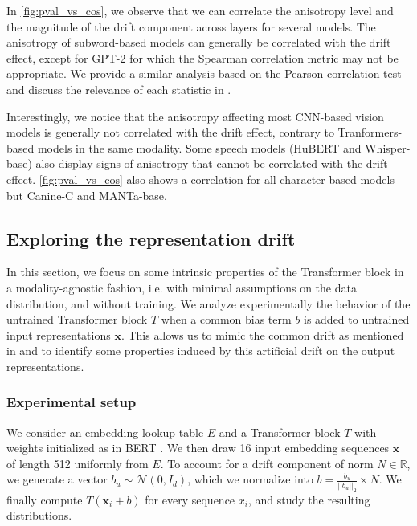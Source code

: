 In \autoref{fig:pval_vs_cos}, we observe that we can correlate the anisotropy level and the magnitude of the drift component across layers for several models. The anisotropy of subword-based models can generally be correlated with the drift effect, except for GPT-2 for which the Spearman correlation metric may not be appropriate. We provide a similar analysis based on the Pearson correlation test and discuss the relevance of each statistic in . 

Interestingly, we notice that the anisotropy affecting most CNN-based vision models is generally not correlated with the drift effect, contrary to Tranformers-based models in the same modality. Some speech models (HuBERT and Whisper-base) also display signs of anisotropy that cannot be correlated with the drift effect. \autoref{fig:pval_vs_cos} also shows a correlation for all character-based models but Canine-C and MANTa-base.

\subsection{Exploring the representation drift}
\label{sec:empirical}
In this section, we focus on some intrinsic properties of the Transformer block in a modality-agnostic fashion, i.e. with minimal assumptions on the data distribution, and without training. We analyze experimentally the behavior of the untrained Transformer block $T$ when a common bias term $b$ is added to untrained input representations $\mathbf{x}$. This allows us to mimic the common drift as mentioned in \citet{bis-etal-2021-much} and to identify some properties induced by this artificial drift on the output representations.

\subsubsection{Experimental setup}
We consider an embedding lookup table $E$ and a Transformer block $T$ with weights initialized as in BERT \citep{devlin-etal-2019-bert}. We then draw 16 input embedding sequences $\mathbf{x}$ of length 512 uniformly from $E$. To account for a drift component of norm $N\in\mathbb{R}$, we generate a vector $b_u \sim \mathcal{N}(0, I_d)$, which we normalize into $b = \frac{b_u}{||b_u||_2}\times N$. We finally compute $T(\mathbf{x}_i + b)$ for every sequence $x_i$, and study the resulting distributions.


